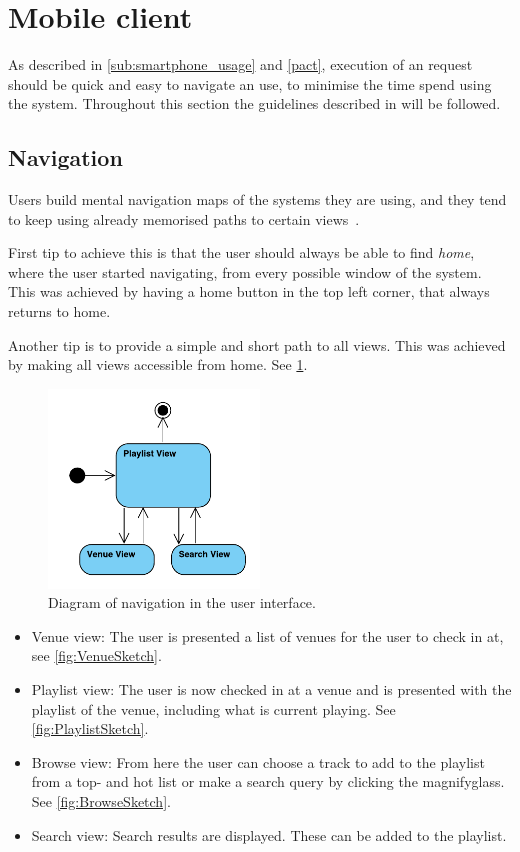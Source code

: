 \section{Mobile client}

As described in \cref{sub:smartphone_usage} and \cref{pact}, execution
of an request should be quick and easy to navigate an use, to minimise
the time spend using the system. Throughout this section the
guidelines described in  will be followed.

\subsection{Navigation}

Users build mental navigation maps of the systems they are using, and
they tend to keep using already memorised paths to certain views~\cite{DEB}.

First tip to achieve this is that the user should always be able to find \emph{home}, where the user started navigating, from every possible window of the system. This was achieved by having a home button in the top left corner, that always returns to home.

Another tip is to provide a simple and short path to all views. This
was achieved by making all views accessible from home. See \cref{fig:UserInterface}.

\begin{figure}[hbtp]
  \centering
  \includegraphics[width=0.5\textwidth]{Images/UserInterface.pdf}
  \caption{Diagram of navigation in the user interface.}\label{fig:UserInterface}
\end{figure}

\begin{itemize}
\item Venue view: The user is presented a list of venues for the user to check in at, see \cref{fig:VenueSketch}.
\item Playlist view: The user is now checked in at a venue and is presented with the playlist of the venue, including what is current playing. See \cref{fig:PlaylistSketch}.
\item Browse view: From here the user can choose a track to add to the playlist from a top- and hot list or make a search query by clicking the magnifyglass. See \cref{fig:BrowseSketch}.
\item Search view: Search results are displayed. These can be added to
  the playlist.
\end{itemize}

